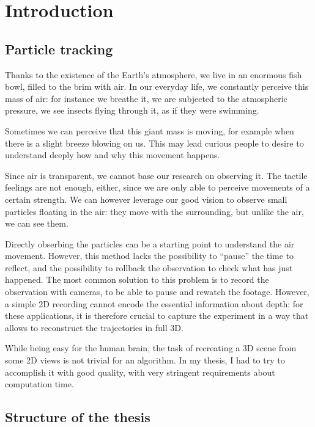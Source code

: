 \chapter{Introduction}
\label{chap:intr}

\section{Particle tracking}

Thanks to the existence of the Earth's atmosphere, we live in an enormous fish bowl, filled to the brim with air.
In our everyday life, we constantly perceive this mass of air: for instance we breathe it, we are subjected to the atmospheric pressure, we see insects flying through it, as if they were swimming.

Sometimes we can perceive that this giant mass is moving, for example when there is a slight breeze blowing on us.
This may lead curious people to desire to understand deeply how and why this movement happens.

Since air is transparent, we cannot base our research on observing it.
The tactile feelings are not enough, either, since we are only able to perceive movements of a certain strength.
We can however leverage our good vision to observe small particles floating in the air: they move with the surrounding, but unlike the air, we can see them.

Directly obserbing the particles can be a starting point to understand the air movement.
However, this method lacks the possibility to ``pause'' the time to reflect, and the possibility to rollback the observation to check what has just happened.
The most common solution to this problem is to record the observation with cameras, to be able to pause and rewatch the footage.
However, a simple 2D recording cannot encode the essential information about depth: for these applications, it is therefore crucial to capture the experiment in a way that allows to reconstruct the trajectories in full 3D.

While being easy for the human brain, the task of recreating a 3D scene from some 2D views is not trivial for an algorithm.
In my thesis, I had to try to accomplish it with good quality, with very stringent requirements about computation time.

\section{Structure of the thesis}

